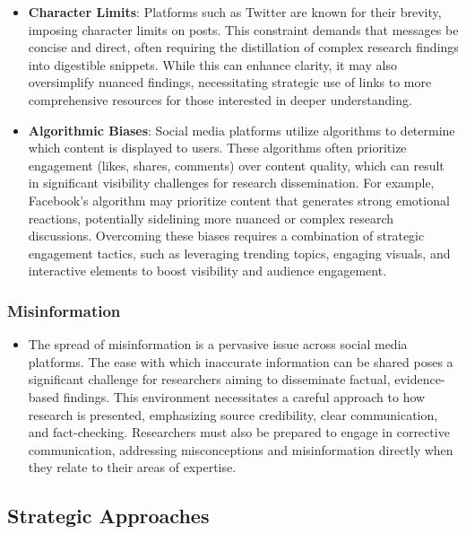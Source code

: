 \documentclass[
]{book}
\providecommand{\tightlist}{%
  \setlength{\itemsep}{0pt}\setlength{\parskip}{0pt}}
\begin{document}
\begin{itemize}
\item
  \textbf{Character Limits}: Platforms such as Twitter are known for their brevity, imposing character limits on posts. This constraint demands that messages be concise and direct, often requiring the distillation of complex research findings into digestible snippets. While this can enhance clarity, it may also oversimplify nuanced findings, necessitating strategic use of links to more comprehensive resources for those interested in deeper understanding.
\item
  \textbf{Algorithmic Biases}: Social media platforms utilize algorithms to determine which content is displayed to users. These algorithms often prioritize engagement (likes, shares, comments) over content quality, which can result in significant visibility challenges for research dissemination. For example, Facebook's algorithm may prioritize content that generates strong emotional reactions, potentially sidelining more nuanced or complex research discussions. Overcoming these biases requires a combination of strategic engagement tactics, such as leveraging trending topics, engaging visuals, and interactive elements to boost visibility and audience engagement.
\end{itemize}

\hypertarget{misinformation}{%
\subsubsection{Misinformation}\label{misinformation}}

\begin{itemize}
\tightlist
\item
  The spread of misinformation is a pervasive issue across social media platforms. The ease with which inaccurate information can be shared poses a significant challenge for researchers aiming to disseminate factual, evidence-based findings. This environment necessitates a careful approach to how research is presented, emphasizing source credibility, clear communication, and fact-checking. Researchers must also be prepared to engage in corrective communication, addressing misconceptions and misinformation directly when they relate to their areas of expertise.
\end{itemize}

\hypertarget{strategic-approaches}{%
\subsection{Strategic Approaches}\label{strategic-approaches}}
\end{document}
